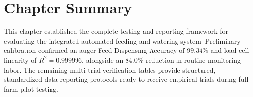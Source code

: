 \section{Chapter Summary}
\label{sec:results_summary}

This chapter established the complete testing and reporting framework for evaluating the integrated automated feeding and watering system. Preliminary calibration confirmed an auger Feed Dispensing Accuracy of $99.34\%$ and load cell linearity of $R^2 = 0.999996$, alongside an $84.0\%$ reduction in routine monitoring labor. The remaining multi-trial verification tables provide structured, standardized data reporting protocols ready to receive empirical trials during full farm pilot testing.
